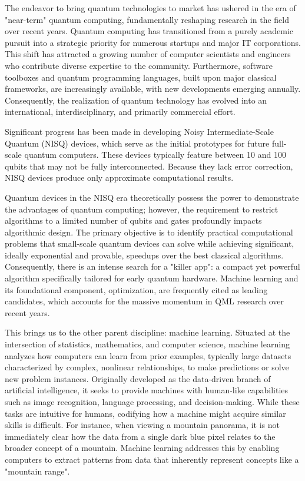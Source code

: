 \documentclass[en]{dimscthesis}
\begin{document}
The endeavor to bring quantum technologies to market has ushered in the era of "near-term" quantum computing, fundamentally reshaping research in the field over recent years. Quantum computing has transitioned from a purely academic pursuit into a strategic priority for numerous startups and major IT corporations. This shift has attracted a growing number of computer scientists and engineers who contribute diverse expertise to the community. Furthermore, software toolboxes and quantum programming languages, built upon major classical frameworks, are increasingly available, with new developments emerging annually. Consequently, the realization of quantum technology has evolved into an international, interdisciplinary, and primarily commercial effort.

Significant progress has been made in developing Noisy Intermediate-Scale Quantum (NISQ) devices, which serve as the initial prototypes for future full-scale quantum computers. These devices typically feature between 10 and 100 qubits that may not be fully interconnected. Because they lack error correction, NISQ devices produce only approximate computational results.

Quantum devices in the NISQ era theoretically possess the power to demonstrate the advantages of quantum computing; however, the requirement to restrict algorithms to a limited number of qubits and gates profoundly impacts algorithmic design. The primary objective is to identify practical computational problems that small-scale quantum devices can solve while achieving significant, ideally exponential and provable, speedups over the best classical algorithms. Consequently, there is an intense search for a "killer app": a compact yet powerful algorithm specifically tailored for early quantum hardware. Machine learning and its foundational component, optimization, are frequently cited as leading candidates, which accounts for the massive momentum in QML research over recent years.

This brings us to the other parent discipline: machine learning. Situated at the intersection of statistics, mathematics, and computer science, machine learning analyzes how computers can learn from prior examples, typically large datasets characterized by complex, nonlinear relationships, to make predictions or solve new problem instances. Originally developed as the data-driven branch of artificial intelligence, it seeks to provide machines with human-like capabilities such as image recognition, language processing, and decision-making. While these tasks are intuitive for humans, codifying how a machine might acquire similar skills is difficult. For instance, when viewing a mountain panorama, it is not immediately clear how the data from a single dark blue pixel relates to the broader concept of a mountain. Machine learning addresses this by enabling computers to extract patterns from data that inherently represent concepts like a "mountain range".
\end{document}
